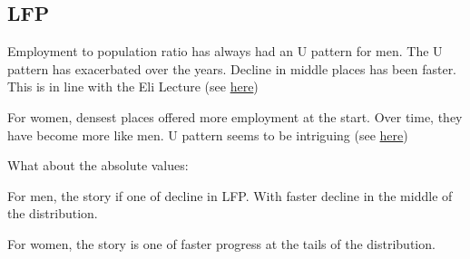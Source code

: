 \subsection{LFP}
\bitem
	\item Employment to population ratio has always had an U pattern for men. The U pattern has exacerbated over the years. Decline in middle places has been faster. This is in line with the Eli Lecture (see \href{https://www.dropbox.com/s/w0m6oerp6mt7edg/bar_graph_lfp_male.png?dl=0}{here})
	\item For women, densest places offered more employment at the start. Over time, they have become more like men. U pattern seems to be intriguing  (see \href{https://www.dropbox.com/s/mhlqjp6k73i9ub4/bar_graph_lfp_women.png?dl=0}{here})
	\item What about the absolute values:
	\bitem
		\item For men, the story if one of decline in LFP. With faster decline in the middle of the distribution.
		\item For women, the story is one of faster progress at the tails of the distribution.
	\eitem
\eitem 


